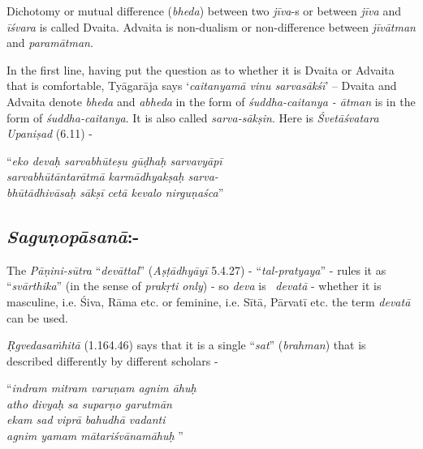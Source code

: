 \newpage

Dichotomy or mutual difference (\textit{bheda}) between two \textit{jīva}-s or between \textit{jīva} and \textit{īśvara} is called Dvaita. Advaita is non-dualism or non-difference between \textit{jīvātman} and \textit{paramātman}. 

In the first line, having put the question as to whether it is Dvaita or Advaita that is comfortable, Tyāgarāja says ‘\textit{caitanyamā vinu sarvasākśī}’ – Dvaita and Advaita denote \textit{bheda} and \textit{abheda} in the form of \textit{śuddha-caitanya - ātman} is in the form of \textit{śuddha-caitanya}. It is also called \textit{sarva-sākṣin}. Here is \textit{Śvetāśvatara Upaniṣad} (6.11) -

\begin{centerquote}
“\textit{eko devaḥ sarvabhūteṣu gūḍhaḥ sarvavyāpī}\\ \textit{sarvabhūtāntarātmā karmādhyakṣaḥ sarva-}\\ \textit{bhūtādhivāsaḥ sākṣī cetā kevalo nirguṇaśca}”
\end{centerquote}

\vspace{-.3cm}

\subsection*{\textit{Saguṇopāsanā}:-}

The \textit{Pāṇini-sūtra} “\textit{devāttal}” (\textit{Aṣṭādhyāyī} 5.4.27) - “\textit{tal-pratyaya}” - rules it as “\textit{svārthika}” (in the sense of \textit{prakṛti only}) - so \textit{deva} is  \textit{devatā} - whether it is masculine, i.e. Śiva, Rāma etc. or feminine, i.e. Sītā\textit{,} Pārvatī etc. the term \textit{devatā} can be used. 

\textit{Ṛgvedasaṁhitā} (1.164.46) says that it is a single “\textit{sat}” (\textit{brahman}) that is described differently by different scholars -

\begin{centerquote}
“\textit{indram mitram varuṇam agnim āhuḥ}\\ \textit{atho divyaḥ sa suparṇo garutmān} \\ \textit{ekam sad viprā bahudhā vadanti}\\ \textit{agnim yamam mātariśvānamāhuḥ} ”
\end{centerquote}

